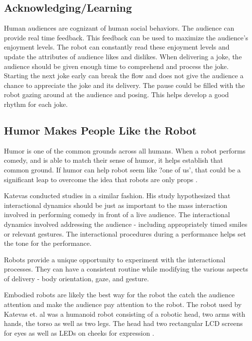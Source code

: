 \subsection{Acknowledging/Learning}
Human audiences are cognizant of human social behaviors. The audience can provide real time feedback. This feedback can be used to maximize the audience's enjoyment levels. The robot can constantly read these enjoyment levels and update the attributes of audience likes and dislikes. When delivering a joke, the audience should be given enough time to comprehend and process the joke. Starting the next joke early can break the flow and does not give the audience a chance to appreciate the joke and its delivery. The pause could be filled with the robot gazing around at the audience and posing. This helps develop a good rhythm for each joke.

\subsection{Humor Makes People Like the Robot }
Humor is one of the common grounds across all humans. When a robot performs comedy, and is able to match their sense of humor, it helps establish that common ground. If humor can help robot seem like ?one of us', that could be a significant leap to overcome the idea that robots are only props \cite{KnightEightLessons:2011}.


Katevas conducted studies in a similar fashion. His study hypothesized that interactional dynamics should be just as important to the mass interaction involved in performing comedy in front of a live audience. The interactional dynamics involved addressing the audience - including appropriately timed smiles or relevant gestures. The interactional procedures during a performance helps set the tone for the performance.

Robots provide a unique opportunity to experiment with the interactional processes. They can have a consistent routine while modifying the various aspects of delivery - body orientation, gaze, and gesture.

Embodied robots are likely the best way for the robot the catch the audience attention and make the audience pay attention to the robot. The robot used by Katevas et. al was a humanoid robot consisting of a robotic head, two arms with hands, the torso as well as two legs. The head had two rectangular LCD screens for eyes as well as LEDs on cheeks for expression \cite{RobotComedyLab:2015}.

